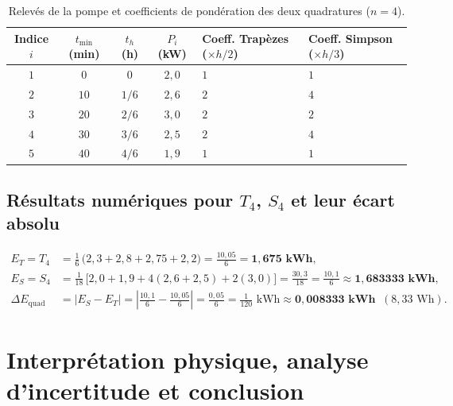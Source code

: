 \documentclass[10pt,a4paper]{article}
\begin{document}
\begin{table}[ht!]
\centering
\caption{Relevés de la pompe et coefficients de pondération des deux quadratures ($n = 4$).}
\label{tab:pompe_data}
\begin{tabularx}{\textwidth}{@{}c c c c >{\centering\arraybackslash}X >{\centering\arraybackslash}X@{}}
\toprule
\textbf{Indice $i$} & \textbf{$t_{\min}$ (min)} & \textbf{$t_h$ (h)} & \textbf{$P_i$ (kW)} & \textbf{Coeff. Trapèzes ($\times h/2$)} & \textbf{Coeff. Simpson ($\times h/3$)} \\
\midrule
$1$ & $0$  & $0$   & $2,0$ & $1$ & $1$ \\
$2$ & $10$ & $1/6$ & $2,6$ & $2$ & $4$ \\
$3$ & $20$ & $2/6$ & $3,0$ & $2$ & $2$ \\
$4$ & $30$ & $3/6$ & $2,5$ & $2$ & $4$ \\
$5$ & $40$ & $4/6$ & $1,9$ & $1$ & $1$ \\
\bottomrule
\end{tabularx}
\end{table}

\subsection{Résultats numériques pour \texorpdfstring{$T_4$, $S_4$}{T4, S4} et leur écart absolu}
\begin{align}
    E_T = T_4 &= \frac{1}{6}\,\bigl(2,3 + 2,8 + 2,75 + 2,2\bigr) = \frac{10,05}{6} = \mathbf{1,675\text{ kWh}}, \\
    E_S = S_4 &= \frac{1}{18}\,\bigl[2,0 + 1,9 + 4(2,6 + 2,5) + 2(3,0)\bigr] = \frac{30,3}{18} = \frac{10,1}{6} \approx \mathbf{1,683333\text{ kWh}}, \\
    \Delta E_{\text{quad}} &= |E_S - E_T| = \left|\frac{10,1}{6} - \frac{10,05}{6}\right| = \frac{0,05}{6} = \frac{1}{120}\text{ kWh} \approx \mathbf{0,008333\text{ kWh}} \;\;(8,33\text{ Wh}).
\end{align}

\section{Interprétation physique, analyse d'incertitude et conclusion}
\end{document}
